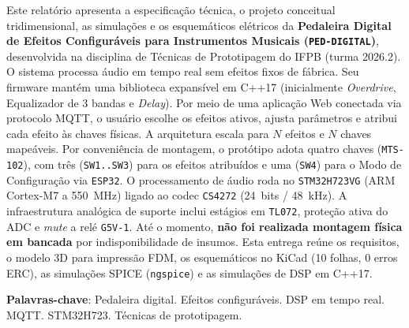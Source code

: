 \documentclass[12pt,openright,oneside,a4paper,brazil]{abntex2}
\begin{document}
\frenchspacing
\imprimircapa
\imprimirfolhaderosto

\begin{resumo}
Este relatório apresenta a especificação técnica, o projeto conceitual tridimensional, as simulações e os esquemáticos elétricos da \textbf{Pedaleira Digital de Efeitos Configuráveis para Instrumentos Musicais (\texttt{PED-DIGITAL})}, desenvolvida na disciplina de Técnicas de Prototipagem do IFPB (turma 2026.2). O sistema processa áudio em tempo real sem efeitos fixos de fábrica. Seu firmware mantém uma biblioteca expansível em C++17 (inicialmente \textit{Overdrive}, Equalizador de 3 bandas e \textit{Delay}). Por meio de uma aplicação Web conectada via protocolo MQTT, o usuário escolhe os efeitos ativos, ajusta parâmetros e atribui cada efeito às chaves físicas. A arquitetura escala para $N$ efeitos e $N$ chaves mapeáveis. Por conveniência de montagem, o protótipo adota quatro chaves (\texttt{MTS-102}), com três (\texttt{SW1..SW3}) para os efeitos atribuídos e uma (\texttt{SW4}) para o Modo de Configuração via \texttt{ESP32}. O processamento de áudio roda no \texttt{STM32H723VG} (ARM Cortex-M7 a 550~MHz) ligado ao codec \texttt{CS4272} (24~bits / 48~kHz). A infraestrutura analógica de suporte inclui estágios em \texttt{TL072}, proteção ativa do ADC e \textit{mute} a relé \texttt{G5V-1}. Até o momento, \textbf{não foi realizada montagem física em bancada} por indisponibilidade de insumos. Esta entrega reúne os requisitos, o modelo 3D para impressão FDM, os esquemáticos no KiCad (10 folhas, 0 erros ERC), as simulações SPICE (\texttt{ngspice}) e as simulações de DSP em C++17.

\vspace{\onelineskip}
\noindent
\textbf{Palavras-chave}: Pedaleira digital. Efeitos configuráveis. DSP em tempo real. MQTT. STM32H723. Técnicas de prototipagem.
\end{resumo}

\listoffigures*
\cleardoublepage

\listoftables*
\cleardoublepage
\end{document}
